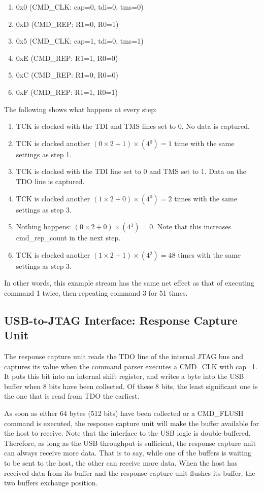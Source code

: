 \documentclass[main\_\_EN.tex]{subfiles}
\begin{document}
\begin{enumerate}
\item 0x0 (CMD\_CLK: cap=0, tdi=0, tms=0)
\item 0xD (CMD\_REP: R1=0, R0=1)
\item 0x5 (CMD\_CLK: cap=1, tdi=0, tms=1)
\item 0xE (CMD\_REP: R1=1, R0=0)
\item 0xC (CMD\_REP: R1=0, R0=0)
\item 0xF (CMD\_REP: R1=1, R0=1)
\end{enumerate}


The following shows what happens at every step:
\begin{enumerate}
\item TCK is clocked with the TDI and TMS lines set to 0. No data is captured.
\item TCK is clocked another \((0\times2+1)\times(4{^0})=1\) time with the same settings as step 1.
\item TCK is clocked with the TDI line set to 0 and TMS set to 1. Data on the TDO line is captured.
\item TCK is clocked another \((1\times2+0)\times(4{^0})=2\) times with the same settings as step 3.
\item Nothing happens: \((0\times2+0)\times(4{^1})=0\). Note that this increases cmd\_rep\_count in the next step.
\item TCK is clocked another \((1\times2+1)\times(4{^2})=48\) times with the same settings as step 3.
\end{enumerate}

In other words, this example stream has the same net effect as that of executing command 1 twice, then repeating command 3 for 51 times.

\subsection{USB-to-JTAG Interface: Response Capture Unit}

The response capture unit reads the TDO line of the internal JTAG bus and captures its value when the command parser executes a CMD\_CLK with cap=1. It puts this bit into an internal shift register, and writes a byte into the USB buffer when 8 bits have been collected. Of these 8 bits, the least significant one is the one that is read from TDO the earliest.

As soon as either 64 bytes (512 bits) have been collected or a CMD\_FLUSH command is executed, the response capture unit will make the buffer available for the host to receive. Note that the interface to the USB logic is double-buffered. Therefore, as long as the USB throughput is sufficient, the response capture unit can always receive more data. That is to say, while one of the buffers is waiting to be sent to the host, the other can receive more data. When the host has received data from its buffer and the response capture unit flushes its buffer, the two buffers exchange position.
\end{document}
